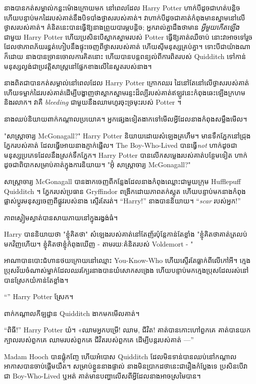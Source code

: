{នាងបានកត់សម្គាល់កន្លះម៉ោងក្រោយមក នៅពេលដែល Harry Potter ហាក់បីដូចជាហត់បន្តិច ហើយបន្ទាប់មកដៃរបស់គាត់នឹងបិទបាំងថ្ងាសរបស់គាត់។ វាហាក់បីដូចជាគាត់កំពុងមានស្នាមនៅលើថ្ងាសរបស់គាត់។ គំនិតនេះបានធ្វើឱ្យនាងព្រួយបារម្ភបន្តិច; អ្នករាល់គ្នាដឹងថាមាន \emph{អ្វីមួយកើតឡើង} ជាមួយ Harry Potter ហើយប្រសិនបើស្លាកស្នាមរបស់ Potter ធ្វើឱ្យគាត់ឈឺចាប់ នោះវាអាចទៅរួចដែលថាភាពភ័យរន្ធត់ហៀបនឹងផ្ទុះចេញពីថ្ងាសរបស់គាត់ ហើយស៊ីមនុស្សគ្រប់គ្នា។ ទោះបីជាយ៉ាងណាក៏ដោយ នាងបានច្រានចោលការគិតនោះ ហើយបានបន្តពន្យល់ពីការពិតរបស់ Quidditch ទៅកាន់មនុស្សល្ងង់ជាប្រវត្តិសាស្ត្រនៅផ្នែកខាងលើនៃសួតរបស់នាង។

នាងពិតជាបានកត់សម្គាល់នៅពេលដែល Harry Potter ក្រោកឈរ ដៃនៅតែនៅលើថ្ងាសរបស់គាត់ ហើយទម្លាក់ដៃរបស់គាត់ដើម្បីបង្ហាញថាស្លាកស្នាមរន្ទះដ៏ល្បីរបស់គាត់ឥឡូវនេះកំពុងឆេះឡើងក្រហម និងរលាក។ វាគឺ \emph{bleeding} ជាមួយនឹងឈាមហូរចុះច្រមុះរបស់ Potter ។

នាងឈប់និយាយពាក់កណ្តាលប្រយោគ។ អ្នកផ្សេងទៀតងាកទៅមើលអ្វីដែលនាងកំពុងសម្លឹងមើល។

"សាស្រ្តាចារ្យ McGonagall?" Harry Potter និយាយដោយសំឡេងគ្រហឹម។ មានទឹកភ្នែកនៅជ្រុងភ្នែករបស់គាត់ ដែលធ្វើអោយនាងភ្ញាក់ផ្អើល។ The Boy-Who-Lived បានធ្វើ\emph{not} ហាក់ដូចជាមនុស្សប្រភេទដែលនឹងស្រក់ទឹកភ្នែក។ Harry Potter បានលើកសម្លេងរបស់គាត់បន្ថែមទៀត ហាក់ដូចជាពិបាកសម្រាប់គាត់ក្នុងការនិយាយ។ "អ៊ុំ សាស្រ្តាចារ្យ McGonagall?"

សាស្រ្តាចារ្យ McGonagall បានងាកចេញពីកន្លែងដែលនាងកំពុងឈ្លោះជាមួយក្រុម Hufflepuff Quidditch ។ ភ្នែករបស់ប្រធាន Gryffindor ពង្រីកដោយភាពតក់ស្លុត ហើយបន្ទាប់មកនាងកំពុងផ្លាស់ប្តូរមនុស្សចេញពីផ្លូវរបស់នាង ស្ទើរតែរត់។ “Harry!” នាងបាននិយាយ។ “\emph{scar} របស់អ្នក!”

ភាពស្ងៀមស្ងាត់បានសាយភាយនៅក្នុងរង្វង់ធំ។

Harry បាននិយាយថា "ខ្ញុំគិតថា" សំឡេងរបស់គាត់នៅតែញ័រប៉ុន្តែកាន់តែខ្លាំង "ខ្ញុំគិតថាគាត់ត្រលប់មកវិញហើយ។ ខ្ញុំគិតថាខ្ញុំកំពុងឃើញ - តាមរយៈគំនិតរបស់ Voldemort - "

អាណាបានបោះជំហានថយក្រោយនៅឈ្មោះ You-Know-Who ហើយស្ទើរតែធ្លាក់ពីលើកៅអី។ ក្មេងប្រុសវ័យចំណាស់ម្នាក់ដែលឈរក្បែរនាងបានយំសោកសង្រេង ហើយបន្ទាប់មកក្មេងប្រុសដែលរស់នៅបានស្រែកយំកាន់តែខ្លាំង។

“” Harry Potter ស្រែក។

ពាក់កណ្តាលកីឡដ្ឋាន Quidditch ងាកមកមើលគាត់។

“ពិធី!” Harry Potter យំ។ «ឈាមអ្នកបម្រើ! ឈាម, ជីវិត! គាត់បានកោះហៅពួកគេ គាត់បានយកក្បាលរបស់ពួកគេ ឈាមរបស់ពួកគេ ជីវិតរបស់ពួកគេ ដើម្បីបន្តរបស់គាត់ —”

Madam Hooch បានផ្លុំកញ្ចែ ហើយអំបោស Quidditch ដែលមិនទាន់បានឈប់នៅកណ្តាលអាកាសបានចាប់ផ្តើមយឺត។ សម្រាប់ខ្លួននាងផ្ទាល់ នាងមិនប្រាកដថានេះជារឿងកំប្លែងទេ ប្រសិនបើវាជា Boy-Who-Lived ឬអត់ គាត់មានបញ្ហាលើសពីអ្វីដែលនាងអាចស្រមៃបាន។

}
